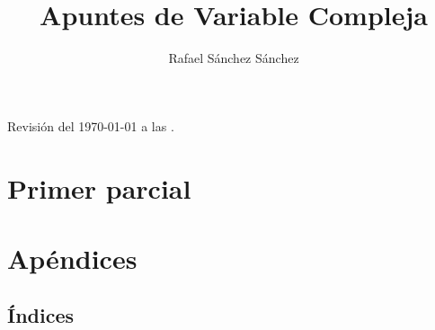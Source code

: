 \documentclass{book}
\title{Apuntes de Variable Compleja}
\author{Rafael S\'{a}nchez S\'{a}nchez}
\newcommand{\0}{\mathbf{0}}
\newcommand{\1}{\mathbf{1}}
\begin{document}
\begin{titlepage}
	
\end{titlepage}


Revisión del \today $ $ a las \currenttime.

\begin{center}

\end{center}

\tableofcontents
\part{Primer parcial}

% 
% 
% 
% 
\part{Apéndices}


%


%

\chapter{\'{I}ndices}

\renewcommand{\listtheoremname}{Lista de definiciones}
\listoftheorems[ignore={thm,eg,pro,cor,obs,lm,ex,th_ex}]

\renewcommand{\listtheoremname}{Lista de teoremas}
\listoftheorems[onlynamed,ignore={dfn,eg,cor,obs,ex,th_ex}]

\renewcommand{\listtheoremname}{Lista de ejemplos}
\listoftheorems[onlynamed,ignore={dfn,thm,pro,cor,obs,lm,ex,th_ex}]

\renewcommand{\listtheoremname}{Lista de ejercicios}
\listoftheorems[ignore={dfn,thm,pro,cor,obs,lm,eg}]

\printglossaries


\end{document}
